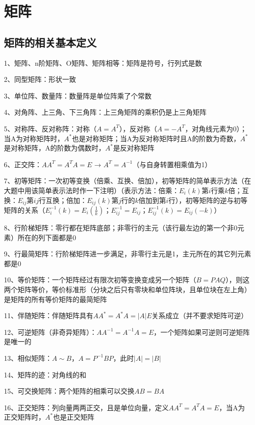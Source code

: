 \chapter{矩阵}

\section{矩阵的相关基本定义}

1、矩阵、n阶矩阵、O矩阵、矩阵相等：矩阵是符号，行列式是数

2、同型矩阵：形状一致

3、单位阵、数量阵：数量阵是单位阵乘了个常数

4、对角阵、上三角、下三角阵：上三角矩阵的乘积仍是上三角矩阵

5、对称阵、反对称阵：对称（$A=A^T$），反对称（$A=-A^T$，对角线元素为0）；当A为对称矩阵时，$A^*$也是对称矩阵；当A为反对称矩阵时且A的阶数为奇数，$A^*$是对称矩阵，A的阶数为偶数时，$A^*$是反对称矩阵

6、正交阵：$AA^T=A^TA=E$ → $A^T = A^{-1}$（与自身转置相乘值为1）

7、初等矩阵：一次初等变换（倍乘、互换、倍加），初等矩阵的简单表示方法（在大题中用该简单表示法时作一下注明）（表示方法：倍乘：$E_{i}(k)$第$i$行乘$k$倍；互换：$E_{ij}$第$ij$行互换；倍加：$E_{ij}(k)$第$j$行的$k$倍加到第$i$行），初等矩阵的逆与初等矩阵的关系（$E_{i}^{-1}(k)=E_{i}(\frac 1 k)$；$E_{ij}^{-1}=E_{ij}$；$E_{ij}^{-1}(k)=E_{ij}(-k)$）

8、行阶梯矩阵：零行都在矩阵底部；非零行的主元（该行最左边的第一个非0元素）所在的列下面都是0

9、行最简矩阵：行阶梯矩阵进一步满足，非零行主元是1，主元所在的其它列元素都是0

10、等价矩阵：一个矩阵经过有限次初等变换变成另一个矩阵（$B=PAQ$），则这两个矩阵等价，等价标准形（分块之后只有零块和单位阵块，且单位块在左上角）是矩阵的所有等价矩阵的最简矩阵

11、伴随矩阵：伴随矩阵具有$AA^*=A^*A=|A|E$关系成立（并不要求矩阵可逆）

12、可逆矩阵（非奇异矩阵）：$AA^{-1}=A^{-1}A=E$，一个矩阵如果可逆则可逆矩阵是唯一的

13、相似矩阵：$A \sim B$，$A=P^{-1}BP$，此时$|A|=|B|$

14、矩阵的迹：对角线的和

15、可交换矩阵：两个矩阵的相乘可以交换$AB=BA$

16、正交矩阵：列向量两两正交，且是单位向量，定义$AA^T=A^TA=E$，当A为正交矩阵时，$A^*$也是正交矩阵

